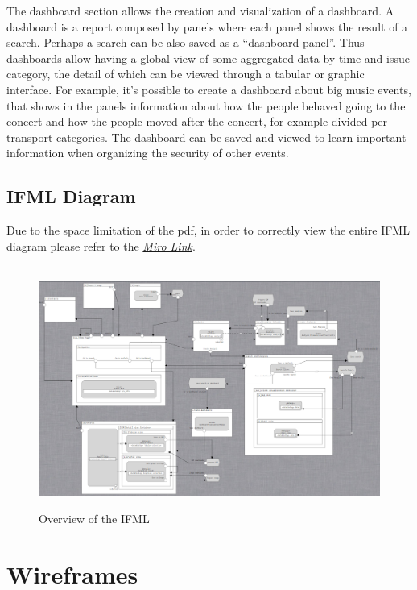\documentclass[../main.tex]{subfiles}
\begin{document}
    The dashboard section allows the creation and visualization of a dashboard. A dashboard is a report composed by panels where each panel shows the result of a search. Perhaps a search can be also saved as a “dashboard panel”. Thus dashboards allow having a global view of some aggregated data by time and issue category, the detail of which can be viewed through a tabular or graphic interface. For example, it’s possible to create a dashboard about big music events, that shows in the panels information about how the people behaved going to the concert and how the people moved after the concert, for example divided per transport categories. The dashboard can be saved and viewed to learn important information when organizing the security of other events.

    \section{IFML Diagram}\label{sec:ifml-diagram}
    Due to the space limitation of the pdf, in order to correctly view the entire IFML diagram please refer to the \href{https://miro.com/app/board/o9J_kuKN_dk=/}{\textit{Miro Link}}.
    \\
    \\
    \begin{figure}[H]
        \centering
        \includegraphics[scale = 1.5]{assets/ifml/ifml_sum.png} \\
        \caption[]{Overview of the IFML}\label{fig:figure4}
    \end{figure}
    \chapter{Wireframes}\label{ch:wireframes}
\end{document}
